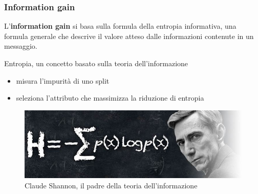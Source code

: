 \begin{frame}
	
	\frametitle{Information gain}
	
	L'\textbf{information gain} si basa sulla formula della entropia informativa, una formula generale che descrive il valore atteso dalle informazioni contenute in un messaggio.
	
	Entropia, un concetto basato sulla teoria dell’informazione
	\begin{itemize}
		\item misura l’impurità di uno split
		\item seleziona l’attributo che massimizza la riduzione di entropia
	\end{itemize}
	
	\begin{figure}[!htbp]
		\centering
		\includegraphics[width=0.9\linewidth]{images/supervised/decision_trees/claude-shannon.jpg}
		\caption{Claude Shannon, il padre della teoria dell'informazione}
	\end{figure}
	
\end{frame}


